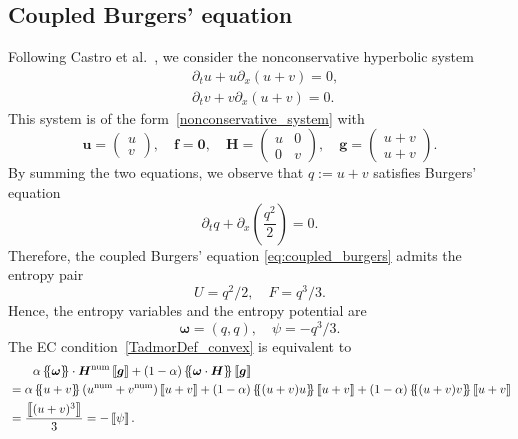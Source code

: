 \documentclass[]{scrartcl}
\newcommand*{\ldblbrace}{\{\mskip-5mu \left \{}
\newcommand*{\rdblbrace}{ \}\mskip-5mu \right \}}
\newcommand{\mean}[1]{\left\ldblbrace #1 \right\rdblbrace}
\renewcommand{\vec}[1]{\boldsymbol{#1}}
\newcommand{\jump}[1]{\left\llbracket #1  \right\rrbracket}
\theoremstyle{definition}
\begin{document}
\subsection{Coupled Burgers' equation}
Following Castro et al.~\cite{Castro2013}, we consider the
nonconservative hyperbolic system
\begin{equation}
\label{eq:coupled_burgers}
\begin{aligned}
    & \partial_t u + u \partial_x (u + v) = 0,\\
    & \partial_t v + v \partial_x (u + v) = 0.
\end{aligned}
\end{equation}
This system is of the form~\eqref{nonconservative_system} with
\begin{equation}
    \vec{u} = \begin{pmatrix} u \\ v \end{pmatrix},\quad
    \vec{f} = \vec{0}, \quad
    \vec{H} = \begin{pmatrix} u & 0 \\ 0 & v \end{pmatrix}, \quad
    \vec{g} = \begin{pmatrix} u+v \\ u+v \end{pmatrix}.
\end{equation}
By summing the two equations, we observe that $q := u + v$ satisfies Burgers' equation~\cite{Castro2013}
\begin{equation}\label{eq_burgers}
\partial_t q + \partial_x\!\left(\frac{q^2}{2}\right) = 0.
\end{equation}
Therefore, the coupled Burgers' equation \eqref{eq:coupled_burgers} admits the entropy pair~\cite{Castro2013}
\begin{equation}
U = q^2/2, \quad F = q^3/3.
\end{equation}
Hence, the entropy variables and the entropy potential are
\begin{equation}
\vec{\omega} = (q, q),\quad \psi = - q^3/3.
\end{equation}
The EC condition~\eqref{TadmorDef_convex} is equivalent to
\begin{equation}
    \label{eq:EC_condition_coupled_burgers}
\begin{aligned}
    &\qquad
    \alpha \mean{\vec{\omega}} \cdot \vec{H}^{\mathrm{num}} \jump{\vec{g}}
    + (1-\alpha) \mean{\vec{\omega} \cdot \vec{H}} \jump{\vec{g}}
    \\
    &=
    \alpha \mean{u+v} \left( u^{\mathrm{num}} + v^{\mathrm{num}} \right) \jump{u+v}
    + (1-\alpha)  \mean{(u+v) u} \jump{u+v}
    + (1-\alpha)  \mean{(u+v) v} \jump{u+v}
    \\
    &=
    \frac{\jump{(u+v)^3}}{3}
    =
    -\jump{\psi}.
\end{aligned}
\end{equation}
\end{document}
